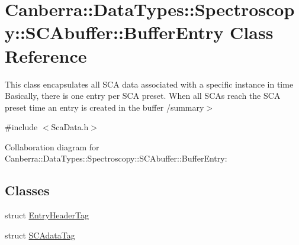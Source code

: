 \hypertarget{class_canberra_1_1_data_types_1_1_spectroscopy_1_1_s_c_abuffer_1_1_buffer_entry}{}\section{Canberra\+:\+:Data\+Types\+:\+:Spectroscopy\+:\+:S\+C\+Abuffer\+:\+:Buffer\+Entry Class Reference}
\label{class_canberra_1_1_data_types_1_1_spectroscopy_1_1_s_c_abuffer_1_1_buffer_entry}


This class encapsulates all S\+CA data associated with a specific instance in time Basically, there is one entry per S\+CA preset. When all S\+CA\textquotesingle{}s reach the S\+CA preset time an entry is created in the buffer /summary$>$  




{\ttfamily \#include $<$Sca\+Data.\+h$>$}



Collaboration diagram for Canberra\+:\+:Data\+Types\+:\+:Spectroscopy\+:\+:S\+C\+Abuffer\+:\+:Buffer\+Entry\+:
\subsection*{Classes}
\begin{DoxyCompactItemize}
\item 
struct \hyperlink{class_canberra_1_1_data_types_1_1_spectroscopy_1_1_s_c_abuffer_1_1_buffer_entry_de/d72/struct_canberra_1_1_data_types_1_1_spectroscopy_1_1_s_c_abuffer_1_1_buffer_entry_1_1_entry_header_tag}{Entry\+Header\+Tag}
\item 
struct \hyperlink{class_canberra_1_1_data_types_1_1_spectroscopy_1_1_s_c_abuffer_1_1_buffer_entry_de/dd8/struct_canberra_1_1_data_types_1_1_spectroscopy_1_1_s_c_abuffer_1_1_buffer_entry_1_1_s_c_adata_tag}{S\+C\+Adata\+Tag}
\end{DoxyCompactItemize}
